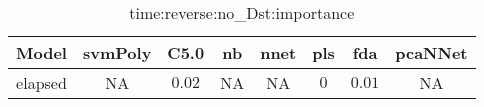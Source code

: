 \begin{table}[!ht]
	\centering
	\begin{tabular}{|c|c|c|c|c|c|c|c|}
		\hline
		Model & svmPoly & C5.0 & nb & nnet & pls & fda & pcaNNet \\ \hline
		elapsed & NA & $0.02$ & NA & NA & $0$ & $0.01$ & NA \\ \hline
	\end{tabular}
	\caption{time:reverse:no_Dst:importance}
	\label{tab:time:reverse:no_Dst:importance}
\end{table}
